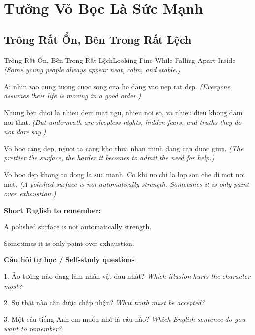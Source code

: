 \chapter{Tưởng Vỏ Bọc Là Sức Mạnh}

\section{Trông Rất Ổn, Bên Trong Rất Lệch}
\begin{truyen}{Trông Rất Ổn, Bên Trong Rất Lệch}{Looking Fine While Falling Apart Inside}
\textit{(Some young people always appear neat, calm, and stable.)}

Ai nhin vao cung tuong cuoc song cua ho dang vao nep rat dep.
\textit{(Everyone assumes their life is moving in a good order.)}

Nhung ben duoi la nhieu dem mat ngu, nhieu noi so, va nhieu dieu khong dam noi that.
\textit{(But underneath are sleepless nights, hidden fears, and truths they do not dare say.)}

Vo boc cang dep, nguoi ta cang kho thua nhan minh dang can duoc giup.
\textit{(The prettier the surface, the harder it becomes to admit the need for help.)}

\end{truyen}

\begin{baihoc}
Vo boc dep khong tu dong la suc manh. Co khi no chi la lop son che di mot noi met.
\textit{(A polished surface is not automatically strength. Sometimes it is only paint over exhaustion.)}
\end{baihoc}

\begin{ghinhoanh}
\textbf{Short English to remember:}

A polished surface is not automatically strength.

Sometimes it is only paint over exhaustion.

\end{ghinhoanh}

\begin{tuhocnhanh}
\textbf{Câu hỏi tự học / Self-study questions}

1. Ảo tưởng nào đang làm nhân vật đau nhất? \textit{Which illusion hurts the character most?}

2. Sự thật nào cần được chấp nhận? \textit{What truth must be accepted?}

3. Một câu tiếng Anh em muốn nhớ là câu nào? \textit{Which English sentence do you want to remember?}
\end{tuhocnhanh}
\ngancach

